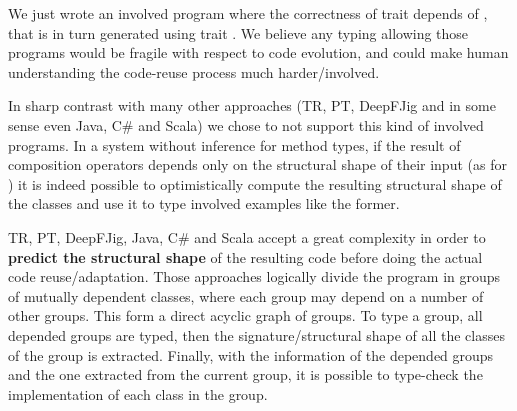 We just wrote an involved program where the correctness of trait \Q@t@ depends of 
\Q@A@, that is in turn generated using trait \Q@t@.
We believe any typing allowing those programs would be fragile with respect to code evolution,
and could make human understanding the code-reuse process much harder/involved.


In sharp contrast with
many other approaches (TR, PT, DeepFJig and in some sense even Java, C\# and Scala)
we chose to not support this kind of involved programs.
In a system without inference for method types,
if the result of composition operators depends only on the
structural shape of their input (as for \use)
it is indeed possible to optimistically compute the resulting structural shape of the classes
and use it to type involved examples like the former.

TR, PT, DeepFJig, Java, C\# and Scala
accept a great complexity in order to \textbf{predict the structural shape} of the resulting code before doing the actual code reuse/adaptation.
Those approaches logically divide the program in groups of mutually dependent classes, where each group may depend on a number of other groups.
This form a direct acyclic graph of groups.
To type a group, all depended groups are typed, then
the signature/structural shape of all
the classes of the group is extracted.
Finally, with the information of the depended groups and the one extracted
from the current group, it is possible to type-check the implementation of each class in the group.



